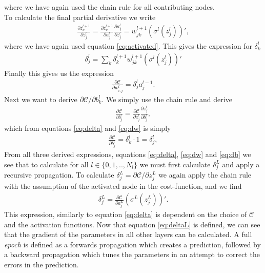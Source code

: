where we have again used the chain rule for all contributing nodes.
\\
To calculate the final partial derivative we write
\begin{align*}
    \frac{\partial z_k^{l+1}}{\partial z^l_j} = \frac{\partial z_k^{l+1}}{\partial a^l_j}\frac{\partial a^l_j}{\partial z^l_j}
                                              = w_{jk}^{l+1}(\sigma^l(z_j^l))',
\end{align*}
where we have again used equation \ref{eq:activated}.
This gives the expression for $\delta_k^l$
\begin{align}\label{eq:delta}
    \delta_j^l  = \sum_k \delta_k^{l+1}w_{jk}^{l+1}(\sigma^l(z_j^l))'  
\end{align}
Finally this gives us the expression
\begin{align}\label{eq:dw}
    \frac{\partial \mathcal{C}}{\partial w_{i,j}^l} = \delta_j^{l} a_j^{l-1}.
\end{align}
Next we want to derive $\partial \mathcal{C}/\partial b^l_k$. We simply use the chain rule and derive
\begin{align*}
    \frac{\partial \mathcal{C}}{\partial b^l_j} = \frac{\partial \mathcal{C}}{\partial z^l_j}\frac{\partial z_j^l}{\partial b^l_j},
\end{align*}
which from equations \ref{eq:delta} and \ref{eq:dw} is simply
\begin{align}\label{eq:db}
    \frac{\partial \mathcal{C}}{\partial b^l_j} = \delta_k^{l} \cdot 1 = \delta_j^{l},
\end{align}
From all three derived expressions, equations \ref{eq:delta}, \ref{eq:dw} and \ref{eq:db} we see that 
to calculate for all $l\in\{0,1,..,N_l\}$ we must first calculate $\delta_j^L$ and apply a recursive propagation.
To calculate $\delta_j^L = \partial \mathcal{C}/\partial z^L_j$ we again apply the chain rule with the assumption of the activated 
node in the cost-function, and we find
\begin{align}\label{eq:deltaL}
    \delta_j^L = \frac{\partial \mathcal{C}}{\partial a^L_j}\left(\sigma^L(z_j^L)\right)'.
\end{align}
This expression, similarly to equation \ref{eq:delta} is dependent on the choice of $\mathcal{C}$ and 
the activation functions. Now that equation \ref{eq:deltaL} is defined, we can see that the
gradient of the parameters in all other layers can be calculated. A full \emph{epoch} is defined as 
a forwards propagation which creates a prediction, followed by a backward propagation which tunes the parameters 
in an attempt to correct the errors in the prediction.
